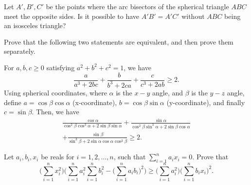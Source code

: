 \begin{question}[name={Problem 2814 in Gazeta Matematica (Bucuresti)}]
	Let $A',B',C'$ be the points where the arc bisectors of the spherical triangle $ABC$ meet the opposite sides. Is it possible to have $A'B'=A'C'$ without $ABC$ being an isosceles triangle?
\end{question}




\begin{question}
	Prove that the following two statements are equivalent, and then prove them separately.
	\begin{tasks}
		\task  For $a,b,c \geq 0$ satisfying $a^2+b^2+c^2=1$, we have
		\[\frac{a}{a^3+2bc}+\frac{b}{b^3+2ca}+\frac{c}{c^3+2ab} \geq 2.\]
		\task Using spherical coordinates, where $\alpha$ is the $x-y$ angle, and $\beta$ is the $y-z$ angle, define $a = \cos \beta \cos \alpha$ (x-coordinate), $b = \cos \beta \sin \alpha$ (y-coordinate), and finally $c = \sin \beta$. Then, we have \begin{multline*}
			\frac{\cos \alpha}{\cos^2 \beta \cos^3 \alpha + 2 \sin \beta \sin \alpha} + \frac{\sin \alpha}{\cos^2 \beta \sin^3 \alpha + 2 \sin \beta \cos \alpha}\\ + \frac{\sin \beta}{\sin^3 \beta + 2 \sin \alpha \cos \alpha \cos^2 \beta}  \geq 2.
		\end{multline*}
	\end{tasks} 
\end{question}




\begin{question}[name={Cauchy--like Spherical Inequality by Fuzzylogic}]
	Let $a_i,b_i,x_i$ be reals for $i=1,2,\dots,n$, such that $\sum_{i=1}^na_ix_i=0$. Prove that
	\[ \bigg(\sum_{i=1}^n x_i^2\bigg) \bigg(\sum_{i=1}^na_i^2\sum_{i=1}^nb_i^2 - \big(\sum_{i=1}^na_ib_i\big)^2\bigg) \ge \bigg(\sum_{i=1}^na_i^2\bigg)\bigg(\sum_{i=1}^nb_ix_i\bigg)^2.  \]
\end{question}





